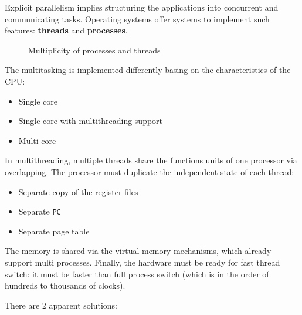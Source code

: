 \documentclass[english]{article}
\begin{document}
Explicit parallelism implies structuring the applications into concurrent and communicating tasks.
Operating systems offer systems to implement such features: \textbf{threads} and \textbf{processes}.

\begin{figure}[htbp]
  \bigskip
  \centering
  \caption{Multiplicity of processes and threads}
  \label{fig:multiplicity-of-processes-and-threads}
  \bigskip
\end{figure}

The multitasking is implemented differently basing on the characteristics of the CPU:

\begin{itemize}
  \item Single core
  \item Single core with multithreading support
  \item Multi core
\end{itemize}

In multithreading, multiple threads share the functions units of one processor via overlapping.
The processor must duplicate the independent state of each thread:

\begin{itemize}
  \item Separate copy of the register files
  \item Separate \texttt{PC}
  \item Separate page table
\end{itemize}

The memory is shared via the virtual memory mechanisms, which already support multi processes.
Finally, the hardware must be ready for fast thread switch: it must be faster than full process switch (which is in the order of hundreds to thousands of clocks).

There are 2 apparent solutions:
\end{document}
